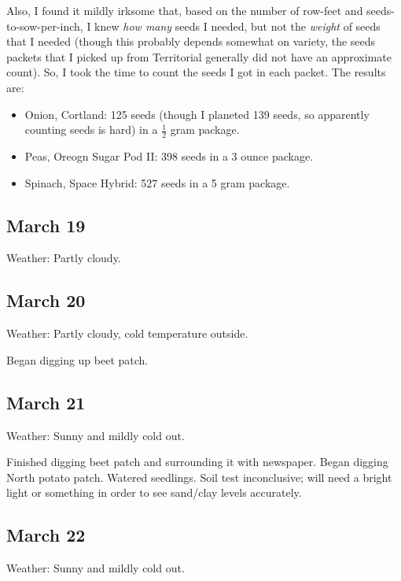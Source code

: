 \documentclass{article}
\begin{document}
Also, I found it mildly irksome that, based on the number of row-feet and seeds-to-sow-per-inch, I knew \textit{how many} seeds I needed, but not the \textit{weight} of seeds that I needed (though this probably depends somewhat on variety, the seeds packets that I picked up from Territorial generally did not have an approximate count). So, I took the time to count the seeds I got in each packet. The results are:
\begin{itemize}
	\item Onion, Cortland: 125 seeds (though I planeted 139 seeds, so apparently counting seeds is hard) in a $\frac{1}{2}$ gram package.
	\item Peas, Oreogn Sugar Pod II: 398 seeds in a 3 ounce package.
	\item Spinach, Space Hybrid: 527 seeds in a 5 gram package.
\end{itemize}

\subsection*{March 19}
Weather: Partly cloudy.

\subsection*{March 20}
Weather: Partly cloudy, cold temperature outside.

Began digging up beet patch.

\subsection*{March 21}
Weather: Sunny and mildly cold out.

Finished digging beet patch and surrounding it with newspaper. Began digging North potato patch. Watered seedlings. Soil test inconclusive; will need a bright light or something in order to see sand/clay levels accurately.

\subsection*{March 22}
Weather: Sunny and mildly cold out.
\end{document}
